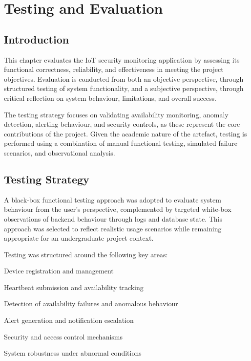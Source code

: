 \chapter{Testing and Evaluation}
\label{ch:test}

\section{Introduction}

This chapter evaluates the IoT security monitoring application by assessing its functional correctness, reliability, and effectiveness in meeting the project objectives. Evaluation is conducted from both an objective perspective, through structured testing of system functionality, and a subjective perspective, through critical reflection on system behaviour, limitations, and overall success.

The testing strategy focuses on validating availability monitoring, anomaly detection, alerting behaviour, and security controls, as these represent the core contributions of the project. Given the academic nature of the artefact, testing is performed using a combination of manual functional testing, simulated failure scenarios, and observational analysis.

\section{Testing Strategy}

A black-box functional testing approach was adopted to evaluate system behaviour from the user's perspective, complemented by targeted white-box observations of backend behaviour through logs and database state. This approach was selected to reflect realistic usage scenarios while remaining appropriate for an undergraduate project context.

Testing was structured around the following key areas:

Device registration and management

Heartbeat submission and availability tracking

Detection of availability failures and anomalous behaviour

Alert generation and notification escalation

Security and access control mechanisms

System robustness under abnormal conditions

